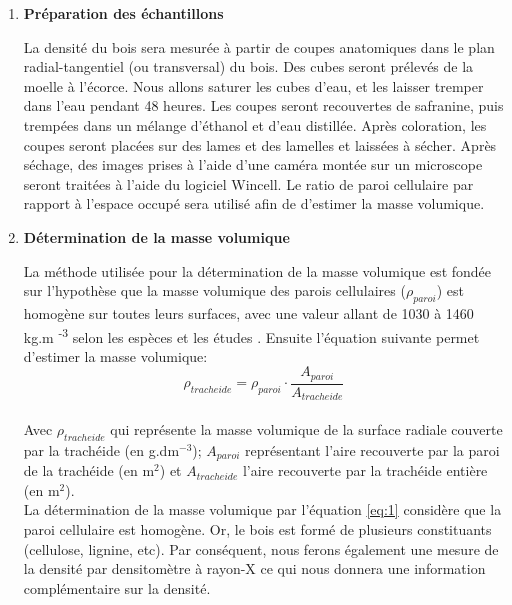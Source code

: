 \documentclass[a4paper,12pt]{report}
\begin{document}
\begin{enumerate}
	 

\item \textbf{Préparation des échantillons}

La densité du bois sera mesurée à partir de coupes anatomiques dans le plan radial-tangentiel (ou transversal) du bois. Des cubes seront prélevés de la moelle à l'écorce. Nous allons saturer les cubes d'eau, et les laisser tremper dans l'eau pendant 48 heures. Les coupes seront recouvertes de safranine, puis trempées dans un mélange d'éthanol et d'eau distillée. Après coloration, les coupes seront placées sur des lames et des lamelles et laissées à sécher. Après séchage, des images prises à l'aide d'une caméra montée sur un microscope seront traitées à l'aide du logiciel Wincell. Le ratio de paroi cellulaire par rapport à l'espace occupé sera utilisé afin de d'estimer la masse volumique. \\

\item \textbf{Détermination de la masse volumique}

La méthode utilisée pour la détermination de la masse volumique est fondée sur l'hypothèse que la masse volumique des parois cellulaires ($\rho_{paroi}$) est homogène sur toutes leurs surfaces, avec une valeur allant de 1030 à 1460 kg.m \textsuperscript{-3} selon les espèces et les études \citep{Decoux2004}. Ensuite l'équation suivante permet d'estimer la masse volumique: \\

\begin{equation}\label{eq:1}
\rho_{tracheide} = \rho_{paroi}\cdot\frac{A_{paroi}}{A_{tracheide}}
\end{equation}\\

Avec $\rho_{tracheide}$ qui représente la masse volumique de la surface radiale couverte par la trachéide (en g.dm$^{-3}$); $A_{paroi}$ représentant l'aire recouverte par la paroi de la trachéide (en m$^{2}$) et $A_{tracheide}$ l'aire recouverte par la trachéide entière (en m$^{2}$).\\

La détermination de la masse volumique par l'équation \ref{eq:1} considère que la paroi cellulaire est homogène. Or, le bois est formé de plusieurs constituants (cellulose, lignine, etc). Par conséquent, nous ferons également une mesure de la densité par densitomètre à rayon-X ce qui nous donnera une information complémentaire sur la densité.
\end{enumerate}
\end{document}
